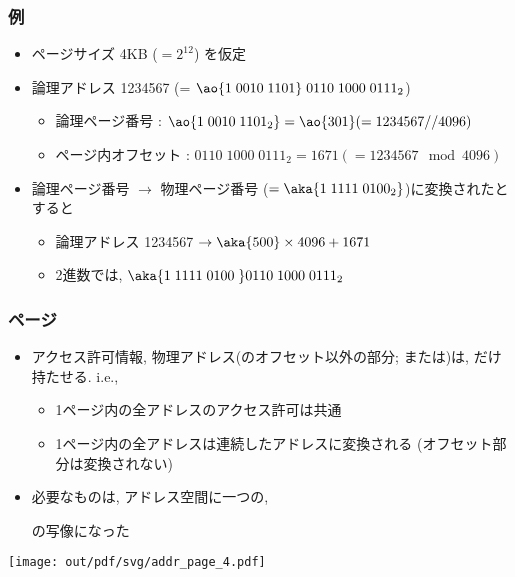 \documentclass[12pt,dvipdfmx]{beamer}
\begin{document}
\begin{frame}
  \frametitle{例}
  \begin{itemize}
  \item ページサイズ 4KB ($= 2^{12}$) を仮定
  \item 論理アドレス 1234567 (= $\ao{1\; 0010\; 1101}\; 0110\; 1000\; 0111_2$)
    \begin{itemize}
  \item 論理ページ番号 : $\ao{1\; 0010\; 1101_2} = \ao{301} (= 1234567 // 4096)$ 
  \item ページ内オフセット : $0110\; 1000\; 0111_2 = 1671 (= 1234567 \mod 4096)$
    \end{itemize}
    
  \item 論理ページ番号  $\rightarrow$ 物理ページ番号  ($= \aka{1\; 1111\; 0100_2}$)に変換されたとすると
    \begin{itemize}
    \item 論理アドレス 1234567 $\rightarrow \aka{500} \times 4096 + 1671$
    \item 2進数では, $\aka{1\; 1111\; 0100\;} 0110\; 1000\; 0111_2$
    \end{itemize}
  \end{itemize}
\end{frame}


\begin{frame}
  \frametitle{ページ}
  \begin{itemize}
  \item アクセス許可情報, 物理アドレス(のオフセット以外の部分;
    または)は,
    だけ持たせる. i.e.,
    \begin{itemize}
    \item 1ページ内の全アドレスのアクセス許可は共通
    \item 1ページ内の全アドレスは連続したアドレスに変換される
      (オフセット部分は変換されない)
    \end{itemize}
    
  \item 必要なものは, アドレス空間に一つの,
    \begin{center}
    \end{center}
    の写像になった
  \end{itemize}
  \begin{center}
    \texttt{[image: out/pdf/svg/addr\_page\_4.pdf]}
  \end{center}
\end{frame}
\end{document}
